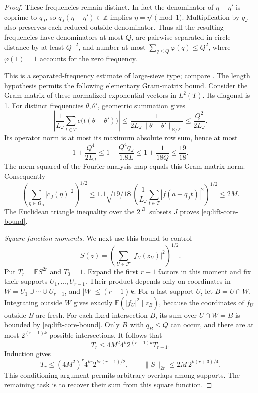 \begin{proof}
These frequencies remain distinct.  In fact the denominator of
\(\eta-\eta'\) is coprime to \(q_J\), so
\(q_J(\eta-\eta')\in\mathbb Z\) implies
\(\eta=\eta'\pmod1\).  Multiplication by \(q_J\) also preserves
each reduced outside denominator.  Thus all the resulting frequencies
have denominators at most \(Q\), are pairwise separated in circle
distance by at least \(Q^{-2}\), and number at most
\(\sum_{q\le Q}\varphi(q)\le Q^2\), where \(\varphi(1)=1\)
accounts for the zero frequency.

This is a separated-frequency estimate of large-sieve type; compare
\cite[Theorem~1]{MontgomeryVaughan1973}. The length hypothesis permits the
following elementary Gram-matrix bound.
Consider the Gram matrix of these normalized exponential vectors in
\(L^2(T)\).  Its diagonal is 1.  For distinct frequencies
\(\theta,\theta'\), geometric summation gives
\[
 \left|\frac1{L_J}\sum_{t\in T}e\bigl(t(\theta-\theta')\bigr)\right|
 \le \frac1{2L_J\|\theta-\theta'\|_{\mathbb R/\mathbb Z}}
 \le\frac{Q^2}{2L_J}.
\]
Its operator norm is at most its maximum absolute row sum, hence at
most
\[
 1+\frac{Q^4}{2L_J}
 \le1+\frac{Q^4q_J}{1.8L}
 \le1+\frac1{18Q}\le\frac{19}{18}.
\]
The norm squared of the Fourier analysis map equals this Gram-matrix
norm.  Consequently
\[
 \left(\sum_{\eta\in\Omega_B}|c_J(\eta)|^2\right)^{1/2}
 \le1.1\sqrt{19/18}\,
       \left(\frac1{L_J}\sum_{t\in T}|f(a+q_Jt)|^2\right)^{1/2}
 \le2M.
\]
The Euclidean triangle inequality over the \(2^{|B|}\) subsets
\(J\) proves \eqref{eq:lift-core-bound}.

\textit{Square-function moments.}\quad
We next use this bound to control
\[
 S(z)=\left(\sum_{U\in\mathcal F}|f_U(z_U)|^2\right)^{1/2}.
\]
Put \(T_r=\mathbb E S^{2r}\) and \(T_0=1\).  Expand the first
\(r-1\) factors in this moment and fix their supports
\(U_1,\ldots,U_{r-1}\).  Their product depends only on coordinates
in \(W=U_1\cup\cdots\cup U_{r-1}\), and \(|W|\le(r-1)k\).
For a last support \(U\), let \(B=U\cap W\).  Integrating outside
\(W\) gives exactly \(\mathbb E(|f_U|^2\mid z_B)\), because the
coordinates of \(f_U\) outside \(B\) are fresh.  For each fixed
intersection \(B\), its sum over \(U\cap W=B\) is bounded by
\eqref{eq:lift-core-bound}.  Only \(B\) with \(q_B\le Q\) can
occur, and there are at most \(2^{(r-1)k}\) possible intersections.
It follows that
\[
 T_r\le4M^2 4^k2^{(r-1)k}T_{r-1}.
\]
Induction gives
\begin{equation}
 T_r\le(4M^2)^r4^{kr}2^{kr(r-1)/2},
 \qquad
 \|S\|_{2r}\le2M\,2^{k(r+3)/4}.
 \label{eq:lift-square-function}
\end{equation}
This conditioning argument permits arbitrary overlaps among supports.
The remaining task is to recover their sum from this square function.


\end{proof}
